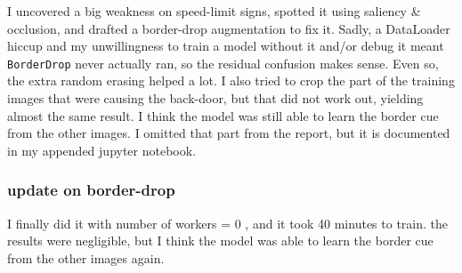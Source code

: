 \documentclass[10pt]{article}
\begin{document}
I uncovered a big weakness on speed-limit signs, spotted it using saliency \& occlusion, and drafted a border-drop augmentation to fix it.  
Sadly, a DataLoader hiccup and my unwillingness to train a model without it and/or debug it meant \texttt{BorderDrop} never actually ran, so the residual confusion makes sense. Even so, the extra random erasing helped a lot. I also tried to crop the part of the training images that were causing the back-door, but that did not work out, yielding almost the same result. I think the model was still able to learn the border cue from the other images. I omitted that part from the report, but it is documented in my appended jupyter notebook.

\subsubsection*{update on border-drop}
I finally did it with number of workers = 0 , and it took 40 minutes to train. the results were negligible, but I think the model was able to learn the border cue from the other images again.
\end{document}
